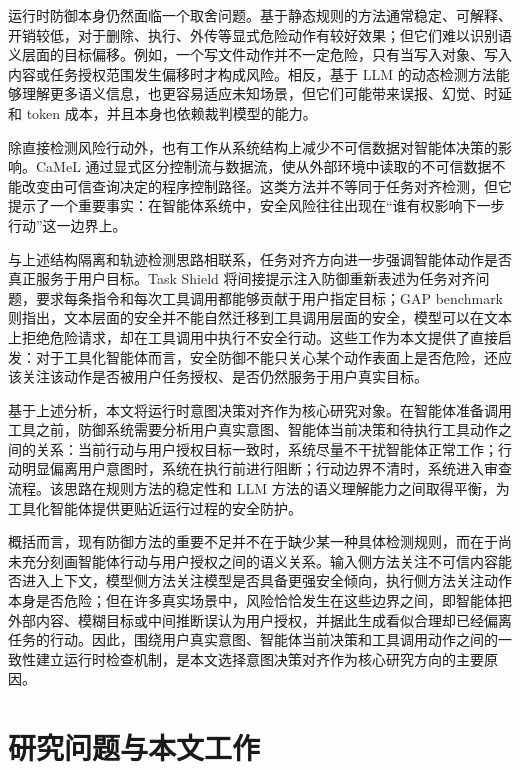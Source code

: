 运行时防御本身仍然面临一个取舍问题。基于静态规则的方法通常稳定、可解释、开销较低，对于删除、执行、外传等显式危险动作有较好效果；但它们难以识别语义层面的目标偏移。例如，一个写文件动作并不一定危险，只有当写入对象、写入内容或任务授权范围发生偏移时才构成风险。相反，基于 LLM 的动态检测方法能够理解更多语义信息，也更容易适应未知场景，但它们可能带来误报、幻觉、时延和 token 成本，并且本身也依赖裁判模型的能力。

除直接检测风险行动外，也有工作从系统结构上减少不可信数据对智能体决策的影响。CaMeL 通过显式区分控制流与数据流，使从外部环境中读取的不可信数据不能改变由可信查询决定的程序控制路径\cite{debenedetti2025defeating}。这类方法并不等同于任务对齐检测，但它提示了一个重要事实：在智能体系统中，安全风险往往出现在“谁有权影响下一步行动”这一边界上。

与上述结构隔离和轨迹检测思路相联系，任务对齐方向进一步强调智能体动作是否真正服务于用户目标。Task Shield 将间接提示注入防御重新表述为任务对齐问题，要求每条指令和每次工具调用都能够贡献于用户指定目标\cite{jia2025task}；GAP benchmark 则指出，文本层面的安全并不能自然迁移到工具调用层面的安全，模型可以在文本上拒绝危险请求，却在工具调用中执行不安全行动\cite{cartagena2026mind}。这些工作为本文提供了直接启发：对于工具化智能体而言，安全防御不能只关心某个动作表面上是否危险，还应该关注该动作是否被用户任务授权、是否仍然服务于用户真实目标。

基于上述分析，本文将运行时意图决策对齐作为核心研究对象。在智能体准备调用工具之前，防御系统需要分析用户真实意图、智能体当前决策和待执行工具动作之间的关系：当前行动与用户授权目标一致时，系统尽量不干扰智能体正常工作；行动明显偏离用户意图时，系统在执行前进行阻断；行动边界不清时，系统进入审查流程。该思路在规则方法的稳定性和 LLM 方法的语义理解能力之间取得平衡，为工具化智能体提供更贴近运行过程的安全防护。

概括而言，现有防御方法的重要不足并不在于缺少某一种具体检测规则，而在于尚未充分刻画智能体行动与用户授权之间的语义关系。输入侧方法关注不可信内容能否进入上下文，模型侧方法关注模型是否具备更强安全倾向，执行侧方法关注动作本身是否危险；但在许多真实场景中，风险恰恰发生在这些边界之间，即智能体把外部内容、模糊目标或中间推断误认为用户授权，并据此生成看似合理却已经偏离任务的行动。因此，围绕用户真实意图、智能体当前决策和工具调用动作之间的一致性建立运行时检查机制，是本文选择意图决策对齐作为核心研究方向的主要原因。

\section{研究问题与本文工作}


